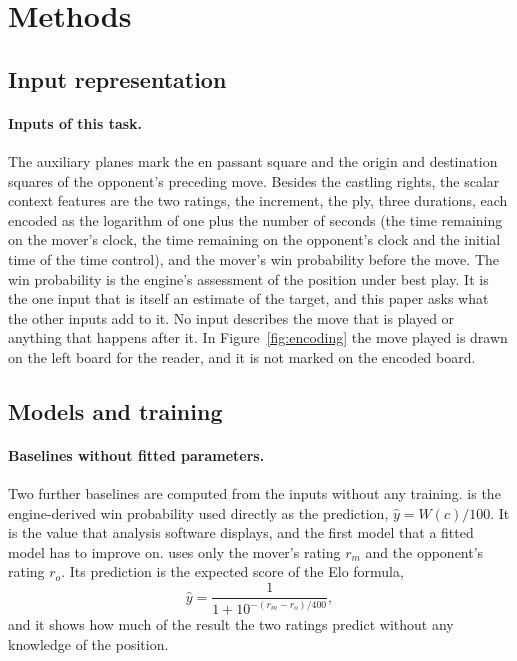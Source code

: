 \documentclass[11pt]{article}
\begin{document}
\begin{table}[htbp]\centering\small
{}
\caption{Summary statistics of selected variables over the whole dataset:
the mean, five quantiles, the minimum and the maximum. Clock times are in
seconds and win probabilities in percent. The win probability lost by the
move and the length of the game are known only afterwards and are not
inputs.}
\label{tab:describe}
\end{table}
\fi

\section{Methods}
\label{sec:methods}

\subsection{Input representation}
\label{sec:input}



\paragraph{Inputs of this task.}
The auxiliary planes mark the en passant square and the origin and
destination squares of the opponent's preceding move. Besides the castling
rights, the scalar context features are the two ratings, the increment, the
ply, three durations, each encoded as the logarithm of one plus the number of
seconds (the time remaining on the mover's clock, the time remaining on the
opponent's clock and the initial time of the time control), and the mover's
win probability before the move. The win probability is the engine's
assessment of the position under best play. It is the one input that is
itself an estimate of the target, and this paper asks what the other inputs
add to it. No input describes the move that is played or anything that
happens after it.\iflook{} In Figure~\ref{fig:encoding} the move played is
drawn on the left board for the reader, and it is not marked on the encoded
board.\fi

\subsection{Models and training}
\label{sec:models}



\paragraph{Baselines without fitted parameters.}
Two further baselines are computed from the inputs without any training.
 is the engine-derived win probability used directly as
the prediction, $\hat{y} = W(c)/100$. It is the value that analysis software
displays, and the first model that a fitted model has to improve on.
 uses only the mover's rating $r_m$ and the opponent's rating
$r_o$. Its prediction is the expected score of the Elo formula,
\[
\hat{y} = \frac{1}{1 + 10^{-(r_m - r_o)/400}},
\]
and it shows how much of the result the two ratings predict without any
knowledge of the position.
\end{document}
